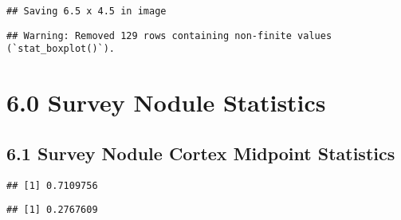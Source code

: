 \documentclass[
]{article}
\newenvironment{Shaded}{\begin{snugshade}}{\end{snugshade}}
\newcommand{\FunctionTok}[1]{\textcolor[rgb]{0.13,0.29,0.53}{\textbf{#1}}}
\newcommand{\NormalTok}[1]{#1}
\newcommand{\SpecialCharTok}[1]{\textcolor[rgb]{0.81,0.36,0.00}{\textbf{#1}}}
\begin{document}
\begin{verbatim}
## Saving 6.5 x 4.5 in image
\end{verbatim}

\begin{verbatim}
## Warning: Removed 129 rows containing non-finite values (`stat_boxplot()`).
\end{verbatim}

\hypertarget{survey-nodule-statistics}{%
\section{6.0 Survey Nodule Statistics}\label{survey-nodule-statistics}}

\hypertarget{survey-nodule-cortex-midpoint-statistics}{%
\subsection{6.1 Survey Nodule Cortex Midpoint
Statistics}\label{survey-nodule-cortex-midpoint-statistics}}

\begin{Shaded}
\end{Shaded}

\begin{verbatim}
## [1] 0.7109756
\end{verbatim}

\begin{Shaded}
\end{Shaded}

\begin{verbatim}
## [1] 0.2767609
\end{verbatim}

\begin{Shaded}
\end{Shaded}
\end{document}
